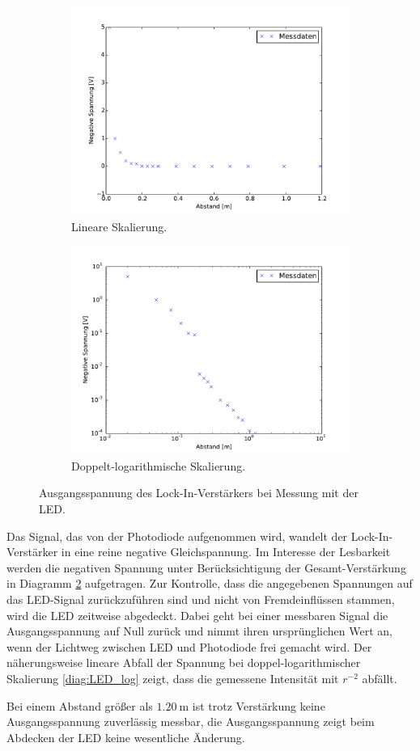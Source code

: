 \begin{figure}[hbp]
	\centering
	\begin{subfigure}{0.8\textwidth}
		\includegraphics[width=\textwidth]{Bilder/LED.pdf}
		\caption{Lineare Skalierung.}
	\end{subfigure}
	\begin{subfigure}{0.8\textwidth}
		\includegraphics[width=\textwidth]{Bilder/LED_log.pdf}
		\caption{Doppelt-logarithmische Skalierung.}
		\label{diag:LED_log}
	\end{subfigure}
	\caption{Ausgangsspannung des Lock-In-Verstärkers bei Messung mit der LED.}
	\label{diag:LED}
\end{figure}
Das Signal, das von der Photodiode aufgenommen wird, wandelt der Lock-In-Verstärker in eine reine negative Gleichspannung.
Im Interesse der Lesbarkeit werden die negativen Spannung unter Berücksichtigung der Gesamt-Verstärkung in Diagramm \ref{diag:LED} aufgetragen.
Zur Kontrolle, dass die angegebenen Spannungen auf das LED-Signal zurückzuführen sind und nicht von Fremdeinflüssen stammen, wird die LED zeitweise abgedeckt.
Dabei geht bei einer messbaren Signal die Ausgangsspannung auf Null zurück und nimmt ihren ursprünglichen Wert an, wenn der Lichtweg zwischen LED und Photodiode frei gemacht wird.
Der näherungsweise lineare Abfall der Spannung bei doppel-logarithmischer Skalierung \eqref{diag:LED_log} zeigt, dass die gemessene Intensität mit $r^{-2}$ abfällt.

Bei einem Abstand größer als $\SI{1.20}{\meter}$ ist trotz Verstärkung keine Ausgangsspannung zuverlässig messbar, 
die Ausgangsspannung zeigt beim Abdecken der LED keine wesentliche Änderung.

